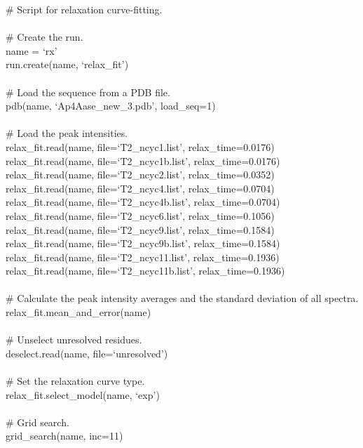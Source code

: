 \begin{exampleenv}
\# Script for relaxation curve-fitting. \\
 \\
\# Create the run. \\
name = `rx' \\
run.create(name, `relax\_fit') \\
 \\
\# Load the sequence from a PDB file. \\
pdb(name, `Ap4Aase\_new\_3.pdb', load\_seq=1) \\
 \\
\# Load the peak intensities. \\
relax\_fit.read(name, file=`T2\_ncyc1.list', relax\_time=0.0176) \\
relax\_fit.read(name, file=`T2\_ncyc1b.list', relax\_time=0.0176) \\
relax\_fit.read(name, file=`T2\_ncyc2.list', relax\_time=0.0352) \\
relax\_fit.read(name, file=`T2\_ncyc4.list', relax\_time=0.0704) \\
relax\_fit.read(name, file=`T2\_ncyc4b.list', relax\_time=0.0704) \\
relax\_fit.read(name, file=`T2\_ncyc6.list', relax\_time=0.1056) \\
relax\_fit.read(name, file=`T2\_ncyc9.list', relax\_time=0.1584) \\
relax\_fit.read(name, file=`T2\_ncyc9b.list', relax\_time=0.1584) \\
relax\_fit.read(name, file=`T2\_ncyc11.list', relax\_time=0.1936) \\
relax\_fit.read(name, file=`T2\_ncyc11b.list', relax\_time=0.1936) \\
 \\
\# Calculate the peak intensity averages and the standard deviation of all spectra. \\
relax\_fit.mean\_and\_error(name) \\
 \\
\# Unselect unresolved residues. \\
deselect.read(name, file=`unresolved') \\
 \\
\# Set the relaxation curve type. \\
relax\_fit.select\_model(name, `exp') \\
 \\
\# Grid search. \\
grid\_search(name, inc=11) \\

\end{exampleenv}
